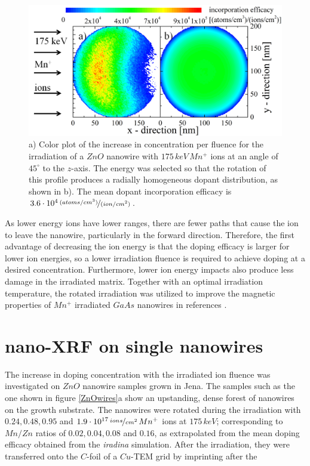 \begin{figure}
	\centering
		\includegraphics[width=.8\textwidth]{images/iradinacrosssection.png}
	\caption{a) Color plot of the increase in concentration per fluence for the irradiation of a $ZnO$ nanowire with $175\,keV\,Mn^+$ ions at an angle of $45^\circ$ to the $z$-axis. The energy was selected so that the rotation of this profile produces a radially homogeneous dopant distribution, as shown in b). The mean dopant incorporation efficacy is $3.6\cdot10^4\,\nicefrac{(atoms/cm^3)}{(ion/cm^2)}$.}
	\label{iradinacrossection}
\end{figure} 

As lower energy ions have lower ranges, there are fewer paths that cause the ion to leave the nanowire, particularly in the forward direction. Therefore, the first advantage of decreasing the ion energy is that the doping efficacy is larger for lower ion energies, so a lower irradiation fluence is required to achieve doping at a desired concentration. Furthermore, lower ion energy impacts also produce less damage in the irradiated matrix. Together with an optimal irradiation temperature, the rotated irradiation was utilized to improve the magnetic properties of $Mn^+$ irradiated $GaAs$ nanowires in references \cite{borschel_new_2011,paschoal_hopping_2012,borschel_ion-solid_2012,kumar_magnetic_2013,paschoal_magnetoresistance_2014}. 




\section{nano-XRF on single nanowires}

The increase in doping concentration with the irradiated ion fluence was investigated on $ZnO$ nanowire samples grown in Jena. The samples such as the one shown in figure \ref{ZnOwires}a show an upstanding, dense forest of nanowires on the growth substrate. The nanowires were rotated during the irradiation with $0.24, 0.48, 0.95$ and $1.9\cdot 10^{17}\,\nicefrac{ions}{cm^2}\,Mn^+$ ions at $175\,keV$; corresponding to $Mn/Zn$ ratios of $0.02, 0.04, 0.08$ and $0.16$, as extrapolated from the mean doping efficacy obtained from the \emph{iradina} simulation. After the irradiation, they were transferred onto the $C$-foil of a $Cu$-TEM grid by imprinting after the

